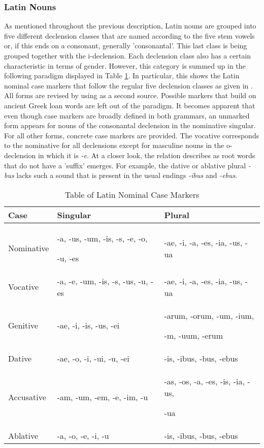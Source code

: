 \documentclass[11pt,a4paper,twoside,openright]{scrbook}
\begin{document}
\subsubsection{Latin Nouns}

As mentioned throughout the previous description, Latin nouns are grouped into five different declension classes that are named according to the five stem vowels or, if this ends on a consonant, generally 'consonantal'. This last class is being grouped together with the i-declension. Each declension class also has a certain characteristic in terms of gender. However, this category is summed up in the following paradigm displayed in Table \ref{table:latin_nouns}. In particular, this shows the Latin nominal case markers that follow the regular five declension classes as given in \citet{touratier2013lat}. All forms are revised by using \citet{rubenbauer1995lat} as a second source. Possible markers that build on ancient Greek loan words are left out of the paradigm. It becomes apparent that even though case markers are broadly defined in both grammars, an unmarked form appears for nouns of the consonantal declension in the nominative singular. For all other forms, concrete case markers are provided. The vocative corresponds to the nominative for all declensions except for masculine nouns in the o-declension in which it is \textit{-e}. At a closer look, the relation \citet{rubenbauer1995lat} describes as root words that do not have a 'suffix' emerges. For example, the dative or ablative plural \textit{-bus} lacks such a sound that is present in the usual endings \textit{-ibus} and \textit{-ebus}.


\begin{table}[!htbp]
\centering

\begin{tabular}{|p{}||p{5cm}|p{5cm}|} 
 \hline
 Case & Singular & Plural \\ [1ex]
 \hline\hline
 Nominative & -a, -us, -um, -is, -s, -e, -o, \par  -u, -es & -ae, -i, -a, -es, -ia, -us, -ua \\ [1ex]
 \hline
 Vocative & -a, -e, -um, -is, -s, -us, -u, -es & -ae, -i, -a, -es, -ia, -us, -ua \\ [1ex]
 \hline
 Genitive & -ae, -i, -is, -us, -ei & -arum, -orum, -um, -ium, \par -m, -uum, -erum \\ [1ex]
 \hline 
 Dative & -ae, -o, -i, -ui, -u, -ei & -is, -ibus, -bus, -ebus  \\ [1ex]
 \hline
 Accusative & -am, -um, -em, -e, -im, -u & -as, -os, -a, -es, -is, -ia, -us, \par -ua  \\ [1ex]
 \hline
 Ablative & -a, -o, -e, -i, -u & -is, -ibus, -bus, -ebus \\ [1ex]
 \hline
\end{tabular}
\caption{Table of Latin Nominal Case Markers}
\label{table:latin_nouns}
\end{table}
\end{document}
